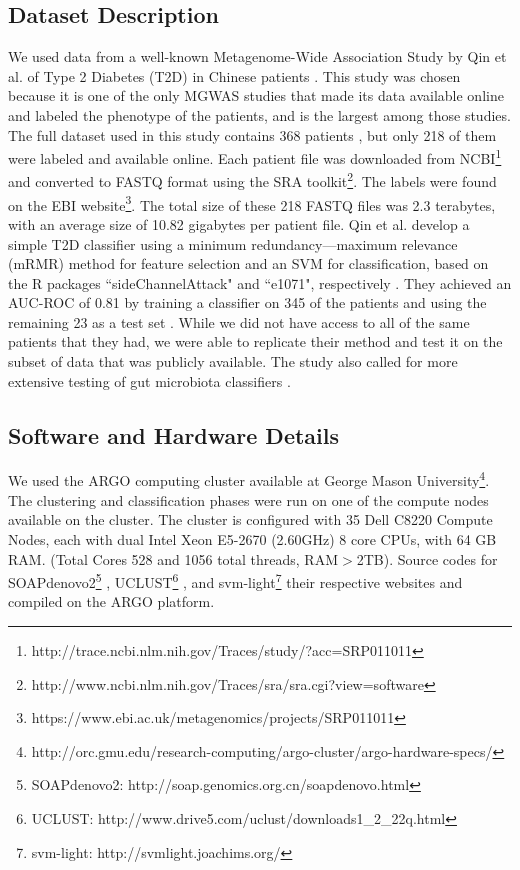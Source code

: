 \subsection{Dataset Description}

We used data from a well-known Metagenome-Wide Association Study by Qin et al. of Type 2 Diabetes (T2D) in Chinese patients \cite{qin041012}. This study was chosen because it is one of the only MGWAS studies that made its data available online and labeled the phenotype of the patients, and is the largest among those studies. The full dataset used in this study contains 368 patients \cite{qin041012}, but only 218 of them were labeled and available online. Each patient file was downloaded from NCBI\footnote{http://trace.ncbi.nlm.nih.gov/Traces/study/?acc=SRP011011}
and converted to FASTQ format using the SRA toolkit\footnote{http://www.ncbi.nlm.nih.gov/Traces/sra/sra.cgi?view=software}.
The labels were found on the EBI website\footnote{https://www.ebi.ac.uk/metagenomics/projects/SRP011011}. The total size of these 218 FASTQ files was 2.3 terabytes, with an average size of 10.82 gigabytes per patient file. Qin et al. develop a simple T2D classifier using a minimum redundancy---maximum relevance (mRMR) method \cite{peng05} for feature selection and an SVM for classification, based on the R packages ``sideChannelAttack" and ``e1071", respectively \cite{qin041012}. They achieved an AUC-ROC of 0.81 by training a classifier on 345 of the patients and using the remaining 23 as a test set \cite{qin041012}. While we did not have access to all of the same patients that they had, we were able to replicate their method and test it on the subset of data that was publicly available. The study also called for more extensive testing of gut microbiota classifiers \cite{qin041012}.

\subsection{Software and Hardware Details}
We used the ARGO computing cluster available at George Mason University\footnote{http://orc.gmu.edu/research-computing/argo-cluster/argo-hardware-specs/}. The clustering and classification phases were run on one of the compute nodes available on the cluster. The cluster is configured with 35 Dell C8220 Compute Nodes, each with dual Intel Xeon E5-2670 (2.60GHz) 8 core CPUs, with 64 GB RAM. (Total Cores 528 and 1056 total threads, RAM$>$2TB). Source codes for 
SOAPdenovo2\footnote{SOAPdenovo2: http://soap.genomics.org.cn/soapdenovo.html} \cite{luo12}, UCLUST\footnote{UCLUST: http://www.drive5.com/uclust/downloads1\_{}2\_{}22q.html}    \cite{Edgar10}, and svm-light\footnote{svm-light: http://svmlight.joachims.org/} \cite{joachims08}
their respective websites and compiled on the ARGO platform.

